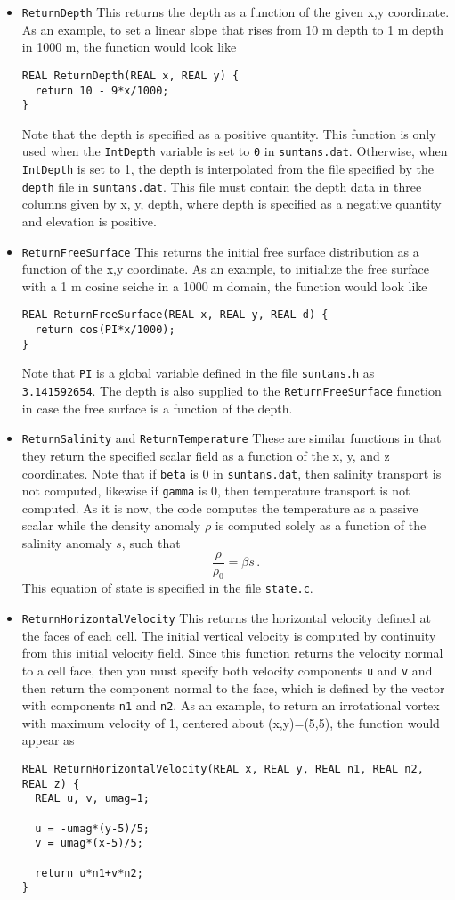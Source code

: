 \begin{itemize}
\item \verb+ReturnDepth+ This returns the depth as a function of the given x,y coordinate. 
As an example, to set a linear slope that rises from 10 m depth to 1 m depth in 1000 m, the
function would look like
\begin{verbatim}
REAL ReturnDepth(REAL x, REAL y) {
  return 10 - 9*x/1000;
}
\end{verbatim}
Note that the depth is specified as a positive quantity.  This function is only used when the \verb+IntDepth+ variable is
set to \verb+0+ in \verb+suntans.dat+.  Otherwise, when \verb+IntDepth+ is set to 1, 
the depth is interpolated from the file specified by the \verb+depth+
file in \verb+suntans.dat+.  This file must contain the depth data in three columns given by x, y, depth, where depth
is specified as a negative quantity and elevation is positive.
\item \verb+ReturnFreeSurface+ This returns the initial free surface distribution as a function of the x,y coordinate.
As an example, to initialize the free surface with a 1 m cosine seiche in a 1000 m domain, the function would look like
\begin{verbatim}
REAL ReturnFreeSurface(REAL x, REAL y, REAL d) {
  return cos(PI*x/1000);
}
\end{verbatim}
Note that \verb+PI+ is a global variable defined in the file \verb+suntans.h+ as \verb+3.141592654+.  The depth
is also supplied to the \verb+ReturnFreeSurface+ function in case the free surface is a function of the depth.
\item \verb+ReturnSalinity+ and \verb+ReturnTemperature+  These are similar functions in that they return the
specified scalar field as a function of the x, y, and z coordinates.  Note that if \verb+beta+ is 0 in \verb+suntans.dat+,
then salinity transport is not computed, likewise if \verb+gamma+ is 0, then temperature transport is not computed.  
As it is now, the code computes the temperature as a passive scalar while the density anomaly $\rho$ is computed solely as a function of the salinity anomaly $s$, such that
\[\frac{\rho}{\rho_0}=\beta s\,.\]  This equation of state is specified in the file \verb+state.c+.
\item \verb+ReturnHorizontalVelocity+ This returns the horizontal velocity defined at the faces of each cell.  The initial vertical velocity is
computed by continuity from this initial velocity field.  Since this function returns the velocity normal to a cell face, then
you must specify both velocity components \verb+u+ and \verb+v+ and then return the component normal to the face, which is
defined by the vector with components \verb+n1+ and \verb+n2+.  As an example, to return an irrotational vortex with
maximum velocity of 1, centered
about (x,y)=(5,5), the function would appear as
\begin{verbatim}
REAL ReturnHorizontalVelocity(REAL x, REAL y, REAL n1, REAL n2, REAL z) {
  REAL u, v, umag=1;

  u = -umag*(y-5)/5;
  v = umag*(x-5)/5;

  return u*n1+v*n2;
}
\end{verbatim}
\end{itemize}

